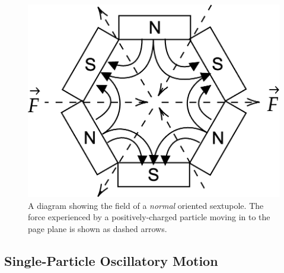 \documentclass[a4paper,twoside,11pt]{report}
\begin{document}
\begin{figure}
    \centering
    \includegraphics*[width=0.4\linewidth]{sextupole.png}
    \caption[Diagram of a sextupole magnetic field]{A diagram showing the field of a \textit{normal} oriented sextupole. The force experienced by a positively-charged particle moving in to the page plane is shown as dashed arrows.}\label{fig:sextupole}
\end{figure}

\subsection{Single-Particle Oscillatory Motion}
\end{document}
